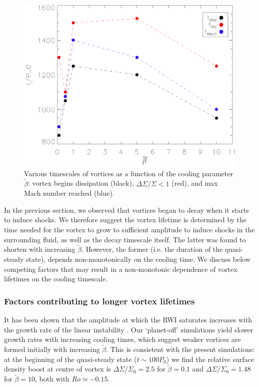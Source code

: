 \begin{figure}
  \includegraphics[width=\linewidth]{figures/betaplot}
  \caption{Various timescales of vortices as a function of the cooling
    parameter $\tilde\beta$: vortex begins dissipation (black),
    $\Delta\Sigma/\Sigma < 1$ (red),
    and max Mach number reached (blue). \label{betaplot}} 
\end{figure}

In the previous section, we observed that vortices began to decay when
it starts to induce shocks. We therefore suggest the vortex lifetime
is determined by the time needed for the vortex to grow to
sufficient amplitude to induce shocks in the surrounding fluid, as
well as the decay timescale itself. The latter was found to shorten
with increasing $\tilde{\beta}$. However, the former (i.e. the
duration of the quasi-steady state), depends non-monotonically on the
cooling time.  
We discuss below competing factors that may
result in a non-monotonic dependence of vortex lifetimes on the cooling timescale.   

\subsubsection{Factors contributing to longer vortex lifetimes}
It has been shown that the amplitude at which the RWI saturates 
increases with the growth rate of the linear instability  
\citep{meheut2013}. Our `planet-off' simulations yield slower growth
rates with increasing cooling times, which suggest weaker vortices are
formed initially with increasing $\tilde{\beta}$. This is consistent
with the present simulations: at the beginning of the 
quasi-steady state ($t\sim100P_0$) we find the relative surface density
boost at centre of vortex is $\Delta\Sigma/\Sigma_0=2.5$ for
$\tilde\beta=0.1$ and $\Delta\Sigma/\Sigma_0=1.48$ for
$\tilde\beta=10$, both with $Ro\simeq-0.15$. 

